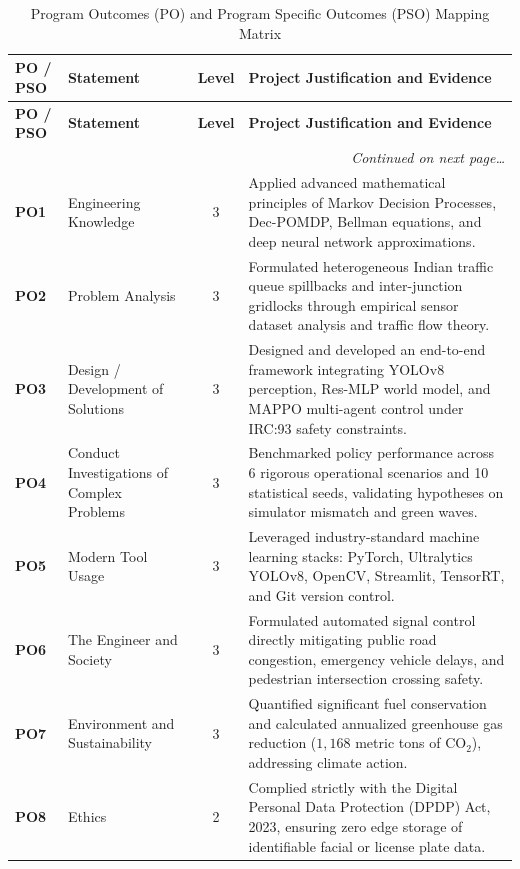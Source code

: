\documentclass[12pt,a4paper,oneside]{report}
\begin{document}
\begin{small}
\begin{longtable}{|p{1.8cm}|p{2.8cm}|c|p{8.2cm}|}
\caption{Program Outcomes (PO) and Program Specific Outcomes (PSO) Mapping Matrix} \label{tab:po_pso_mapping} \\
\hline
\textbf{PO / PSO} & \textbf{Statement} & \textbf{Level} & \textbf{Project Justification and Evidence} \\ \hline
\endfirsthead
\hline
\textbf{PO / PSO} & \textbf{Statement} & \textbf{Level} & \textbf{Project Justification and Evidence} \\ \hline
\endhead
\hline
\multicolumn{4}{|r|}{\textit{Continued on next page\dots}} \\ \hline
\endfoot
\hline
\endlastfoot

\textbf{PO1} & Engineering Knowledge & 3 & Applied advanced mathematical principles of Markov Decision Processes, Dec-POMDP, Bellman equations, and deep neural network approximations. \\ \hline
\textbf{PO2} & Problem Analysis & 3 & Formulated heterogeneous Indian traffic queue spillbacks and inter-junction gridlocks through empirical sensor dataset analysis and traffic flow theory. \\ \hline
\textbf{PO3} & Design / Development of Solutions & 3 & Designed and developed an end-to-end framework integrating YOLOv8 perception, Res-MLP world model, and MAPPO multi-agent control under IRC:93 safety constraints. \\ \hline
\textbf{PO4} & Conduct Investigations of Complex Problems & 3 & Benchmarked policy performance across 6 rigorous operational scenarios and 10 statistical seeds, validating hypotheses on simulator mismatch and green waves. \\ \hline
\textbf{PO5} & Modern Tool Usage & 3 & Leveraged industry-standard machine learning stacks: PyTorch, Ultralytics YOLOv8, OpenCV, Streamlit, TensorRT, and Git version control. \\ \hline
\textbf{PO6} & The Engineer and Society & 3 & Formulated automated signal control directly mitigating public road congestion, emergency vehicle delays, and pedestrian intersection crossing safety. \\ \hline
\textbf{PO7} & Environment and Sustainability & 3 & Quantified significant fuel conservation and calculated annualized greenhouse gas reduction ($1,168$ metric tons of $\text{CO}_2$), addressing climate action. \\ \hline
\textbf{PO8} & Ethics & 2 & Complied strictly with the Digital Personal Data Protection (DPDP) Act, 2023, ensuring zero edge storage of identifiable facial or license plate data. \\ \hline

\end{longtable}
\end{small}
\end{document}
